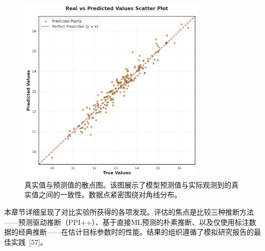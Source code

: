 \documentclass[12pt,a4paper]{article}
\begin{document}
\begin{figure}[H]
    \centering
    \includegraphics[width=0.8\textwidth]{real_vs_predicted_default.png}
    \caption{真实值与预测值的散点图。该图展示了模型预测值与实际观测到的真实值之间的一致性。数据点紧密围绕对角线分布。}
    \label{fig:real_vs_predicted_default}
\end{figure}

本章节详细呈现了对比实验所获得的各项发现。评估的焦点是比较三种推断方法——预测驱动推断（PPI++）、基于直接ML预测的朴素推断、以及仅使用标注数据的经典推断——在估计目标参数时的性能。结果的组织遵循了模拟研究报告的最佳实践~{[57]}。
\end{document}
